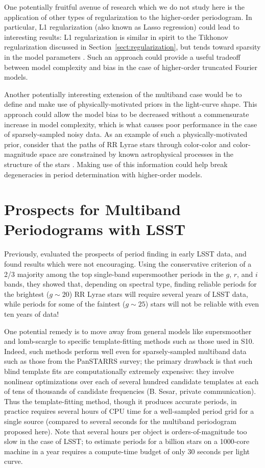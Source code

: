 \documentclass{emulateapj}
\newcommand{\Sect}[1]{Section~\ref{sect:#1}}
\newcommand{\sect}[1]{\Sect{#1}}
\newcommand{\sectlabel}[1]{\label{sect:#1}}
\begin{document}
One potentially fruitful avenue of research which we do not study here is the application of other types of regularization to the higher-order periodogram.
In particular, L1 regularization (also known as Lasso regression) could lead to interesting results: L1 regularization is similar in spirit to the Tikhonov regularization discussed in \sect{regularization}, but tends toward sparsity in the model parameters \citep[see, e.g.][for a discussion]{ICVG2014}.
Such an approach could provide a useful tradeoff between model complexity and bias in the case of higher-order truncated Fourier models.

Another potentially interesting extension of the multiband case would be to define and make use of physically-motivated priors in the light-curve shape.
This approach could allow the model bias to be decreased without a commensurate increase in model complexity, which is what causes poor performance in the case of sparsely-sampled noisy data.
As an example of such a physically-motivated prior, consider that the paths of RR Lyrae stars through color-color and color-magnitude space are constrained by known astrophysical processes in the structure of the stars \citep[e.g., see Fig. 5 in][]{Szabo2014}. Making use of this information could help break degeneracies in period determination with higher-order models.

\section{Prospects for Multiband Periodograms with LSST}
\sectlabel{LSST}
Previously, \citet{Oluseyi12} evaluated the prospects of period finding in early LSST data, and found results which were not encouraging.
Using the conservative criterion of a 2/3 majority among the top single-band supersmoother periods in the $g$, $r$, and $i$ bands, they showed that, depending on spectral type, finding reliable periods for the brightest ($g \sim 20$) RR Lyrae stars will require several years of LSST data, while periods for some of the faintest ($g \sim 25$) stars will not be reliable with even ten years of data!

One potential remedy is to move away from general models like supersmoother and lomb-scargle to specific template-fitting methods such as those used in S10.
Indeed, such methods perform well even for sparsely-sampled multiband data such as those from the PanSTARRS survey; the primary drawback is that such blind template fits are computationally extremely expensive: they involve nonlinear optimizations over each of several hundred candidate templates at each of tens of thousands of candidate frequencies (B. Sesar, private communication).
Thus the template-fitting method, though it produces accurate periods, in practice requires several hours of CPU time for a well-sampled period grid for a single source (compared to several seconds for the multiband periodogram proposed here).
Note that several hours per object is orders-of-magnitude too slow in the case of LSST; to estimate periods for a billion stars on a 1000-core machine in a year requires a compute-time budget of only 30 seconds per light curve.
\end{document}
